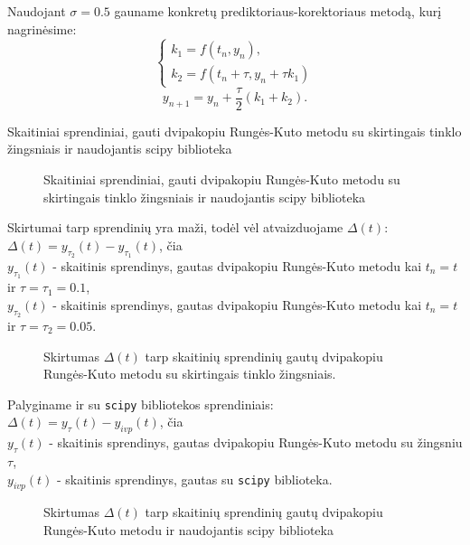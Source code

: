 \documentclass[]{VUMIFTemplateClass}
\newcommand{\tone}{0.1}
\newcommand{\ttwo}{0.05}
\begin{document}
Naudojant $\sigma = 0.5$ gauname konkretų prediktoriaus-korektoriaus metodą, kurį nagrinėsime:
\begin{equation}
    \begin{cases}
        k_1 = f(t_n, y_n),\\
        k_2 = f(t_n + \tau, y_n + \tau k_1)
    \end{cases}
\end{equation}
\[ y_{n+1} = y_n + \frac{\tau}{2} (k_1 + k_2). \]

\begin{table}[H]
    \begin{center}
        
    \end{center}
    \caption{Skaitiniai sprendiniai, gauti dvipakopiu Rungės-Kuto metodu su skirtingais tinklo žingsniais ir naudojantis scipy biblioteka}
\end{table}

\begin{figure}[H]
    \begin{center}
        
    \end{center}
    \caption{Skaitiniai sprendiniai, gauti dvipakopiu Rungės-Kuto metodu su skirtingais tinklo žingsniais ir naudojantis scipy biblioteka}
\end{figure}

Skirtumai tarp sprendinių yra maži, todėl vėl atvaizduojame $\Delta(t)$:\\
$\Delta(t) = y_{\tau_2}(t) - y_{\tau_1}(t)$, čia\\
$y_{\tau_1}(t)$ - skaitinis sprendinys, gautas dvipakopiu Rungės-Kuto metodu kai $t_n = t$ ir $\tau = \tau_1 = \tone$,\\
$y_{\tau_2}(t)$ - skaitinis sprendinys, gautas dvipakopiu Rungės-Kuto metodu kai $t_n = t$ ir $\tau = \tau_2 = \ttwo$.

\begin{figure}[H]
    \begin{center}
        
    \end{center}
    \caption{Skirtumas $\Delta(t)$ tarp skaitinių sprendinių gautų dvipakopiu Rungės-Kuto metodu su skirtingais tinklo žingsniais.}
\end{figure}

Palyginame ir su \texttt{scipy} bibliotekos sprendiniais:\\
$\Delta(t) = y_{\tau}(t) - y_{ivp}(t)$, čia\\
$y_{\tau}(t)$ - skaitinis sprendinys, gautas dvipakopiu Rungės-Kuto metodu su žingsniu $\tau$,\\
$y_{ivp}(t)$ - skaitinis sprendinys, gautas su \texttt{scipy} biblioteka.
\begin{figure}[H]
    \begin{center}
        
    \end{center}
    \caption{Skirtumas $\Delta(t)$ tarp skaitinių sprendinių gautų dvipakopiu Rungės-Kuto metodu ir naudojantis scipy biblioteka}
\end{figure}
\end{document}
